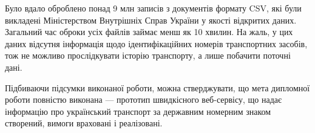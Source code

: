 Було вдало оброблено понад 9 млн записів з документів формату CSV,
які були викладені Міністерством Внутрішніх Справ України у якості відкритих даних.
Загальний час оброки усіх файлів займає менш як 10 хвилин.
На жаль, у цих даних відсутня інформація щодо ідентифікаційних
номерів транспортних засобів, тож не можливо
прослідкувати історію транспорту, а лише побачити поточні дані.

Підбиваючи підсумки виконаної роботи, можна стверджувати, що мета
дипломної роботи повністю виконана — прототип швидкісного веб-сервісу,
що надає інформацію про український транспорт за державним номерним знаком створений,
вимоги враховані і реалізовані.